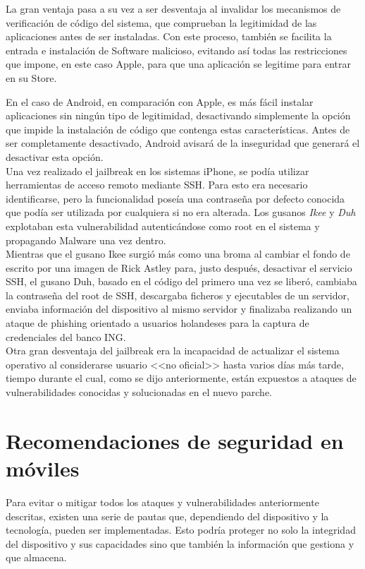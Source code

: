 \documentclass[11pt]{article}
\begin{document}
{La gran ventaja pasa a su vez a ser desventaja al invalidar los mecanismos de verificación de código del sistema, que comprueban la legitimidad de las aplicaciones antes de ser instaladas. Con este proceso, también se facilita la entrada e instalación de Software malicioso, evitando así todas las restricciones que impone, en este caso Apple, para que una aplicación se legitime para entrar en su Store.}

\newpage
{En el caso de Android, en comparación con Apple, es más fácil instalar aplicaciones sin ningún tipo de legitimidad, desactivando simplemente la opción que impide la instalación de código que contenga estas características. Antes de ser completamente desactivado, Android avisará de la inseguridad que generará el desactivar esta opción.} \\

{Una vez realizado el jailbreak en los sistemas iPhone, se podía utilizar herramientas de acceso remoto mediante SSH. Para esto era necesario identificarse, pero la funcionalidad poseía una contraseña por defecto conocida que podía ser utilizada por cualquiera si no era alterada. Los gusanos \textit{Ikee} y \textit{Duh} explotaban esta vulnerabilidad autenticándose como root en el sistema y propagando Malware una vez dentro.} \\

{Mientras que el gusano Ikee surgió más como una broma al cambiar el fondo de escrito por una imagen de Rick Astley para, justo después, desactivar el servicio SSH, el gusano Duh, basado en el código del primero una vez se liberó, cambiaba la contraseña del root de SSH, descargaba ficheros y ejecutables de un servidor, enviaba información del dispositivo al mismo servidor y finalizaba realizando un ataque de phishing orientado a usuarios holandeses para la captura de credenciales del banco ING.} \\

{Otra gran desventaja del jailbreak era la incapacidad de actualizar el sistema operativo al considerarse usuario <<no oficial>> hasta varios días más tarde, tiempo durante el cual, como se dijo anteriormente, están expuestos a ataques de vulnerabilidades conocidas y solucionadas en el nuevo parche.}

\section{Recomendaciones de seguridad en móviles}

{Para evitar o mitigar todos los ataques y vulnerabilidades anteriormente descritas, existen una serie de pautas que, dependiendo del dispositivo y la tecnología, pueden ser implementadas. Esto podría proteger no solo la integridad del dispositivo y sus capacidades sino que también la información que gestiona y que almacena.} \\
\end{document}
